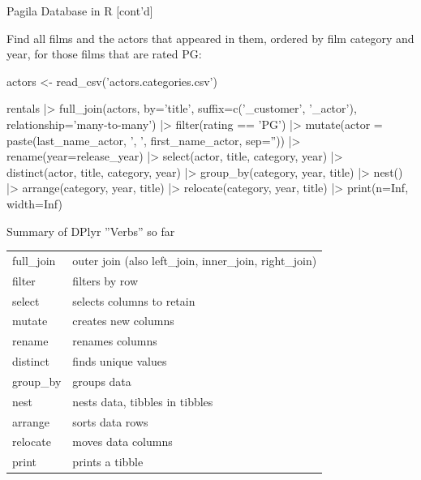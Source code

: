\documentclass[ignorenonframetext,xcolor=x11names]{beamer}
\begin{document}
\begin{frame}[fragile]{Pagila Database in R \small [cont'd]}

Find all films and the actors that appeared in them, ordered by film category and year, for those films that are rated PG:

\scriptsize
\begin{Rcode}
actors <- read_csv('actors.categories.csv')

rentals |> 
    full_join(actors, 
        by='title', 
        suffix=c('_customer', '_actor'), 
        relationship='many-to-many') |>
    filter(rating == 'PG') |>
    mutate(actor = 
        paste(last_name_actor, ', ', 
        first_name_actor, sep='')) |>
    rename(year=release_year) |>
    select(actor, title, category, year) |>
    distinct(actor, title, category, year) |>
    group_by(category, year, title) |> 
    nest() |>
    arrange(category, year, title) |>
    relocate(category, year, title) |>
    print(n=Inf, width=Inf)
\end{Rcode}
\end{frame}

\begin{frame}{Summary of DPlyr ''Verbs'' so far}
\centering
\renewcommand{\arraystretch}{1.25}

\begin{tabular}{l|l} \hline
full\_join & outer join (also left\_join, inner\_join, right\_join) \\
filter & filters by row \\
select & selects columns to retain \\
mutate & creates new columns \\
rename & renames columns \\
distinct & finds unique values \\
group\_by & groups data \\
nest & nests data, tibbles in tibbles \\
arrange & sorts data rows \\
relocate & moves data columns \\
print & prints a tibble \\ \hline
\end{tabular}
\end{frame}
\end{document}
